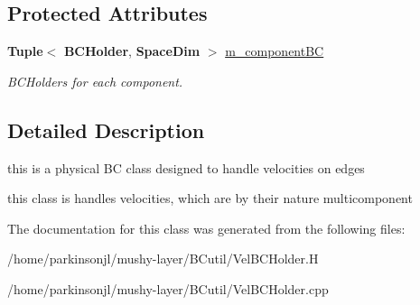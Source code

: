 \subsection*{Protected Attributes}
\begin{DoxyCompactItemize}
\item 
\mbox{\label{class_edge_vel_b_c_holder_a80cc4520258374af4f7b76851d989bb2}} 
\textbf{ Tuple}$<$ \textbf{ B\+C\+Holder}, \textbf{ Space\+Dim} $>$ \hyperlink{class_edge_vel_b_c_holder_a80cc4520258374af4f7b76851d989bb2}{m\+\_\+component\+BC}
\begin{DoxyCompactList}\small\item\em B\+C\+Holders for each component. \end{DoxyCompactList}\end{DoxyCompactItemize}


\subsection{Detailed Description}
this is a physical BC class designed to handle velocities on edges 

this class is handles velocities, which are by their nature multicomponent 

The documentation for this class was generated from the following files\+:\begin{DoxyCompactItemize}
\item 
/home/parkinsonjl/mushy-\/layer/\+B\+Cutil/Vel\+B\+C\+Holder.\+H\item 
/home/parkinsonjl/mushy-\/layer/\+B\+Cutil/Vel\+B\+C\+Holder.\+cpp\end{DoxyCompactItemize}
